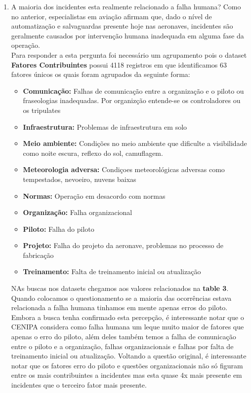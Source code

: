 \documentclass[conference]{IEEEtran}
\begin{document}
\begin{enumerate}
 \item A maioria dos incidentes esta realmente relacionado a falha humana? Como no anterior, especialistas em aviação afirmam que, dado o nível de automatização e salvaguardas 
 presente hoje nas aeronaves, incidentes são geralmente causados por intervenção humana inadequada em alguma fase da operação.\\
 
 Para responder a esta pergunta foi necessário um agrupamento pois o dataset \textbf{Fatores Contribuintes} possui 4118 registros em que identificamos 63 fatores únicos os quais
 foram agrupados da seguinte forma:
 
 \begin{itemize}
  \item \textbf{Comunicação:} Falhas de comunicação entre a organização e o piloto ou fraseologias inadequadas. Por organizção entende-se os controladores ou os tripulates
  \item \textbf{Infraestrutura:} Problemas de infraestrutura em solo
  \item \textbf{Meio ambiente:} Condições no meio ambiente que dificulte a visibilidade como noite escura, reflexo do sol, camuflagem.
  \item \textbf{Meteorologia adversa:} Condiçoes meteorológicas adversas como tempestados, nevoeiro, nuvens baixas
  \item \textbf{Normas:} Operação em desacordo com normas
  \item \textbf{Organização:} Falha organizacional
  \item \textbf{Piloto:} Falha do piloto
  \item \textbf{Projeto:} Falha do projeto da aeronave, problemas no processo de fabricação
  \item \textbf{Treinamento:} Falta de treinamento inicial ou atualização
 \end{itemize}
 
 NAs buscas nos datasets chegamos aos valores relacionados na \textbf{table 3}. Quando colocamos o questionamento se a maioria das ocorrências estava relacionada a falha
 humana tinhamos em mente apenas erros do piloto. Embora a busca tenha confirmado esta percepção, é interessante notar que o CENIPA considera como falha humana um leque 
 muito maior de fatores que apenas o erro do piloto, além deles também temos a falha de comunicação entre o piloto e a organização, falhas organizacionais e falhas por 
 falta de treinamento inicial ou atualização. Voltando a questão original, é interessante notar que os fatores erro do piloto e questões organizacionais não só figuram 
 entre os mais contribuintes a incidentes mas esta quase 4x mais presente em incidentes que o terceiro fator mais presente.\\
 
\end{enumerate}
\end{document}
